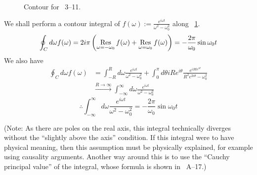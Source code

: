 \item

\begin{figure}[h]
	\centering
	\caption{Contour for ~3--11.}%
	\label{fig:problem3-11}
\end{figure}

We shall perform a contour integral of $f(\omega) := \frac{e^{i\omega t}}{\omega^2 - \omega_0^2}$ along ~\ref{fig:problem3-11}.
\[
	\oint_C d\omega f(\omega)
	= 2i\pi \left( \mathop{\mathrm{Res}}_{\omega = -\omega_0} f(\omega) + \mathop{\mathrm{Res}}_{\omega = \omega_0} f(\omega) \right)
	= -\frac{2\pi}{\omega_0} \sin \omega_0 t
\]
We also have
\begin{align*}
	\oint_C d\omega f(\omega)
	 & = \int_{-R}^R d\omega \frac{e^{i\omega t}}{\omega^2 - \omega_0^2}
	+ \int_0^\pi d\theta iRe^{i\theta} \frac{e^{iRte^{i\theta}}}{R^2 e^{2i\theta} - \omega_0^2}                     \\
	 & \xrightarrow{R \rightarrow \infty} \int_{-\infty}^\infty d\omega \frac{e^{i\omega t}}{\omega^2 - \omega_0^2}
\end{align*}
\[
	\therefore \int_{-\infty}^{\infty} d\omega \frac{e^{i\omega t}}{\omega^2 - \omega_0^2}
	= -\frac{2\pi}{\omega_0} \sin \omega_0 t
\]

(Note: As there are poles on the real axis, this integral technically diverges without the ``slightly above the axis'' condition.
If this integral were to have physical meaning, then this assumption must be physically explained, for example using causality arguments.
Another way around this is to use the ``Cauchy principal value'' of the integral, whose formula is shown in ~A--17.)